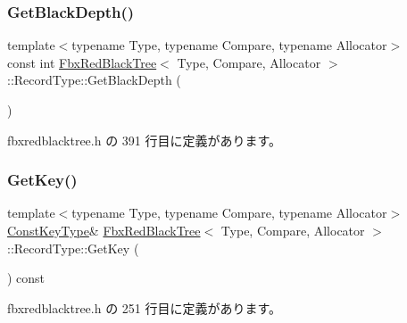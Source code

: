 \subsubsection{\texorpdfstring{Get\+Black\+Depth()}{GetBlackDepth()}}
{\footnotesize\ttfamily template$<$typename Type, typename Compare, typename Allocator$>$ \\
const int \hyperlink{class_fbx_red_black_tree}{Fbx\+Red\+Black\+Tree}$<$ Type, Compare, Allocator $>$\+::Record\+Type\+::\+Get\+Black\+Depth (\begin{DoxyParamCaption}{ }\end{DoxyParamCaption})\hspace{0.3cm}{\ttfamily [inline]}}



 fbxredblacktree.\+h の 391 行目に定義があります。

\mbox{\label{class_fbx_red_black_tree_1_1_record_type_a3844e4735fb81e224eb8c24cedc761c5}} 
\subsubsection{\texorpdfstring{Get\+Key()}{GetKey()}}
{\footnotesize\ttfamily template$<$typename Type, typename Compare, typename Allocator$>$ \\
\hyperlink{class_fbx_red_black_tree_ad0aa82c0fd952b04edb550fc1fb36a32}{Const\+Key\+Type}\& \hyperlink{class_fbx_red_black_tree}{Fbx\+Red\+Black\+Tree}$<$ Type, Compare, Allocator $>$\+::Record\+Type\+::\+Get\+Key (\begin{DoxyParamCaption}{ }\end{DoxyParamCaption}) const\hspace{0.3cm}{\ttfamily [inline]}}



 fbxredblacktree.\+h の 251 行目に定義があります。

\mbox{\label{class_fbx_red_black_tree_1_1_record_type_a300348e40e4648c7371d20c398862bec}} 
